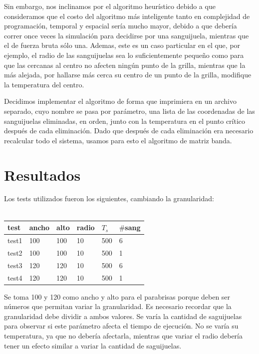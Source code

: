 \documentclass[a4paper]{article}
\begin{document}
Sin embargo, nos inclinamos por el algoritmo heurístico debido a que consideramos que el costo del algoritmo más inteligente tanto en complejidad de programación, temporal y espacial sería mucho mayor, debido a que debería correr once veces la simulación para decidirse por una sanguijuela, mientras que el de fuerza bruta sólo una. Ademas, este es un caso particular en el que, por ejemplo, el radio de las sanguijuelas sea lo suficientemente pequeño como para que las cercanas al centro no afecten ningún punto de la grilla, mientras que la más alejada, por hallarse más cerca su centro de un punto de la grilla, modifique la temperatura del centro.

Decidimos implementar el algoritmo de forma que imprimiera en un archivo separado, cuyo nombre se pasa por parámetro, una lista de las coordenadas de las sanguijuelas eliminadas, en orden, junto con la temperatura en el punto crítico después de cada eliminación. Dado que después de cada eliminación era necesario recalcular todo el sistema, usamos para esto el algoritmo de matriz banda. \newline \newline

\newpage

\section{Resultados}
\label{sec:res}

Los tests utilizados fueron los siguientes, cambiando la granularidad: \\ \\
\begin{center}
\begin{tabular}{ l|l l l l l}
  test & ancho & alto & radio & $T_s$ & $\#$sang \\
  \hline
  test1 & 100 & 100 & 10 & 500 & 6 \\
  test2 & 100 & 100 & 10 & 500 & 1 \\
  test3 & 120 & 120 & 10 & 500 & 6 \\
  test4 & 120 & 120 & 10 & 500 & 1 
\end{tabular}  
\end{center}
Se toma 100 y 120 como ancho y alto para el parabrisas porque deben ser números que permitan variar la granularidad. Es necesario recordar que la granularidad debe dividir a ambos valores. Se varía la cantidad de saguijuelas para observar si este parámetro afecta el tiempo de ejecución. No se varía su temperatura, ya que no debería afectarla, mientras que variar el radio debería tener un efecto similar a variar la cantidad de saguijuelas.
  
\end{document}
